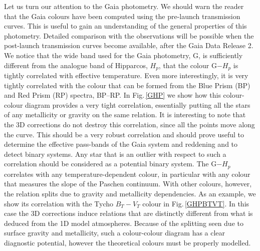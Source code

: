 \documentclass[]{aa}
\begin{document}
Let us turn our attention to the Gaia photometry. We should
warn the reader that the Gaia colours have been computed using the pre-launch
transmission curves. This is useful to gain an understanding of the general
properties of this photometry. Detailed comparison with the observations
will be possible when the post-launch transmission curves become
available, after the Gaia Data Release 2.
We notice that the wide band used for the Gaia photometry, G, is 
sufficiently different from the analogue band of Hipparcos, $H_p$, that the
colour G$-H_p$ is tightly correlated with effective temperature. 
Even more interestingly, it is very tightly correlated with the colour
that can be formed from the Blue Prism (BP) and Red Prism (RP) spectra, BP--RP.
In Fig.\,\ref{GHP} we show how this colour-colour diagram provides a very
tight correlation, essentially putting all the stars of any metallicity
or gravity on the same relation. It is interesting to note that the
3D corrections do not destroy this correlation, since all the points
move along the curve.
This should be a very robust correlation and should prove useful to
determine the effective pass-bands of the Gaia system and reddening and to 
detect binary systems. Any star that is an outlier with respect to such
a correlation should be considered as a potential binary system.
The  G$-H_p$ correlates with any temperature-dependent colour, 
in particular with any colour that measures the slope of
the Paschen continuum. With other colours, however, the relation splits
due to gravity and metallicity dependencies. 
As an example, we show its correlation with the Tycho $B_T - V_T$ colour
in Fig.\,\ref{GHPBTVT}.
In this case the 3D corrections induce  relations that are distinctly different
from what is deduced from the 1D model atmospheres. 
Because of the splitting seen due to 
surface gravity and metallicity, such a colour-colour diagram has a clear
diagnostic potential, however the theoretical colours must be properly
modelled.
\end{document}
